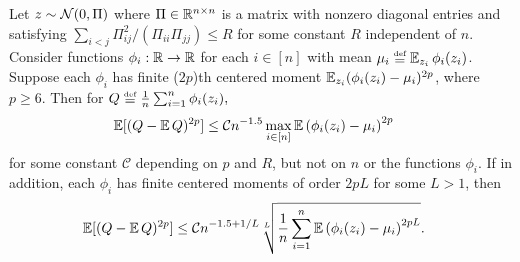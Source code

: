 \documentclass[main.tex]{subfiles}
\begin{document}
\begin{thm}\label{thm:controlHighMoments}
\newcommand{\LL}{2p}
\newcommand{\CC}{\mathcal{C}}
Let $z \sim \mathcal{N}(0, \Pi)$ where $\Pi \in \mathbb{R}^{n \times n}$ is a matrix with nonzero diagonal entries and
satisfying $\sum_{i<j} \Pi_{ij}^2 / (\Pi_{ii} \Pi_{jj}) \le R$
for some constant $R$ independent of $n$.
Consider functions $\phi_i: \mathbb{R} \to \mathbb{R}$ for each $i \in [n]$ with mean $\mu_i \defeq \EV_{z_i} \phi_i(z_i)$.
Suppose each $\phi_i$ has finite ($\LL$)th centered moment $\EV_{z_i} (\phi_i(z_i) - \mu_i)^{\LL}$, where $p \ge 6$.
Then for $Q \defeq \f 1 n \sum_{i=1}^n \phi_i(z_i),$ %
\begin{align*}
    \EV[(Q - \EV Q)^{2p}]
        &\le
           \CC
            n^{-1.5} \max_{i \in [n]}
                \EV
                    \left(\phi_{i}(z_i) - \mu_i \right)^{2p}
\end{align*}
for some constant $\CC$ depending on $p$ and $R$, but not on $n$ or the functions $\phi_i$.
If in addition, each $\phi_i$ has finite centered moments of order $2p L$ for some $L > 1$, then
\begin{align*}
    \EV[(Q - \EV Q)^{2p}]
        &\le
           \CC
            n^{-1.5+1/L}
                \sqrt[L]{\f 1 n \sum_{i=1}^n 
                    \EV
                    \left(\phi_{i}(z_i) - \mu_i \right)^{2p L}
                    }
            .
\end{align*}
\end{thm}
\end{document}
